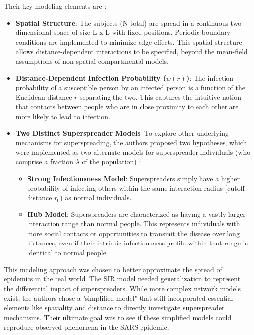 \documentclass{article}
\begin{document}
Their key modeling elements are :
\begin{itemize}[leftmargin=*, align=left]
    \item \textbf{Spatial Structure}: The subjects (N total) are spread in a continuous two-dimensional space of size L x L with fixed positions. Periodic boundary conditions are implemented to minimize edge effects. This spatial structure allows distance-dependent interactions to be specified, beyond the mean-field assumptions of non-spatial compartmental models.
    \item \textbf{Distance-Dependent Infection Probability (\(w(r)\))}: The infection probability of a susceptible person by an infected person is a function of the Euclidean distance \(r\) separating the two. This captures the intuitive notion that contacts between people who are in close proximity to each other are more likely to lead to infection.
    \item \textbf{Two Distinct Superspreader Models}: To explore other underlying mechanisms for superspreading, the authors proposed two hypotheses, which were implemented as two alternate models for superspreader individuals (who comprise a fraction \(\lambda\) of the population) :
    \begin{itemize}
        \item \textbf{Strong Infectiousness Model}: Superspreaders simply have a higher probability of infecting others within the same interaction radius (cutoff distance \(r_0\)) as normal individuals.
        \item \textbf{Hub Model}: Superspreaders are characterized as having a vastly larger interaction range than normal people. This represents individuals with more social contacts or opportunities to transmit the disease over long distances, even if their intrinsic infectiousness profile within that range is identical to normal people.
    \end{itemize}
\end{itemize}
This modeling approach was chosen to better approximate the spread of epidemics in the real world. The SIR model needed generalization to represent the differential impact of superspreaders. While more complex network models exist, the authors chose a "simplified model" that still incorporated essential elements like spatiality and distance to directly investigate superspreader mechanisms. Their ultimate goal was to see if these simplified models could reproduce observed phenomena in the SARS epidemic.

\end{document}
